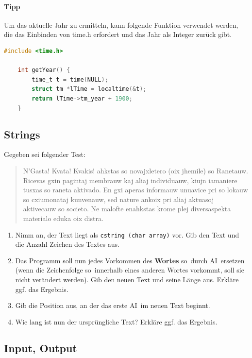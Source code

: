 \documentclass[11pt, a4paper]{article}
\begin{document}
\paragraph{Tipp} Um das aktuelle Jahr zu ermitteln, kann folgende Funktion verwendet werden, die das Einbinden von time.h erfordert und das Jahr als Integer zurück gibt.
\begin{lstlisting}[language=C]
	#include <time.h>

	int getYear() {
		time_t t = time(NULL);
		struct tm *lTime = localtime(&t);
		return lTime->tm_year + 1900;
	}
\end{lstlisting}

\subsection{Strings}
Gegeben sei folgender Test:
\begin{quote}
	N'Gasta! Kvata! Kvakis! ahkstas so novajxletero (oix jhemile) so Ranetauw. Ricevas gxin pagintaj membrauw kaj aliaj individuauw, kiujn iamaniere tusxas so raneta aktivado. En gxi aperas informauw unuavice pri so lokauw so cxiumonataj kunvenauw, sed nature ankoix pri aliaj aktuasoj aktivecauw so societo. Ne malofte enahkstas krome plej diversaspekta materialo eduka oix distra.
\end{quote}
\begin{enumerate}
	\item Nimm an, der Text liegt als \texttt{cstring (char array)} vor. Gib den Text und die Anzahl Zeichen des Textes aus.
	\item Das Programm soll nun jedes Vorkommen des \textbf{Wortes} \glqq so\grqq\ durch \glqq AI\grqq\ ersetzen (wenn die Zeichenfolge \glqq so\grqq\ innerhalb eines anderen Wortes vorkommt, soll sie nicht verändert werden). Gib den neuen Text und seine Länge aus. Erkläre ggf. das Ergebnis.
	\item Gib die Position aus, an der das erste \glqq AI\grqq\ im neuen Text beginnt.
	\item Wie lang ist nun der ursprüngliche Text? Erkläre ggf. das Ergebnis.
\end{enumerate}

\subsection{Input, Output}
\end{document}
